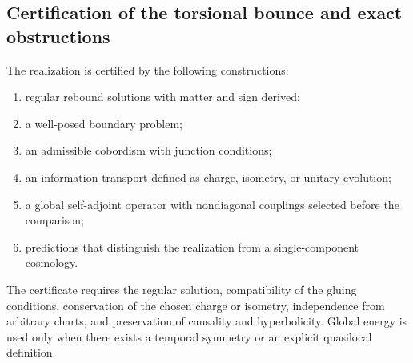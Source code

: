 \subsection{Certification of the torsional bounce and exact obstructions}
\label{sec:condiciones-prueba-cosmologia-hmt}

The realization is certified by the following constructions:
\begin{enumerate}
 \item regular rebound solutions with matter and sign derived;
 \item a well-posed boundary problem;
 \item an admissible cobordism with junction conditions;
 \item an information transport defined as charge, isometry, or
 unitary evolution;
 \item a global self-adjoint operator with nondiagonal couplings
 selected before the comparison;
 \item predictions that distinguish the realization from a single-component
 cosmology.
\end{enumerate}

The certificate requires the regular solution, compatibility of the
gluing conditions, conservation of the chosen charge or isometry,
independence from arbitrary charts, and preservation of causality
and hyperbolicity. Global energy is used only when there exists a
temporal symmetry or an explicit quasilocal definition.
